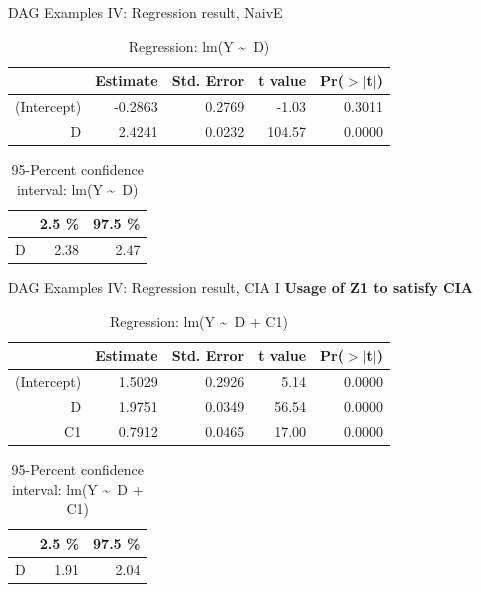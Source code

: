 \documentclass{beamer}\usepackage[]{graphicx}\usepackage[]{xcolor}
\begin{document}
\begin{frame}[fragile]{DAG Examples IV: Regression result, NaivE}
\begin{table}[ht]
\centering
\begingroup\small
\begin{tabular}{rrrrr}
  \hline
 & Estimate & Std. Error & t value & Pr($>$$|$t$|$) \\ 
  \hline
(Intercept) & -0.2863 & 0.2769 & -1.03 & 0.3011 \\ 
  D & 2.4241 & 0.0232 & 104.57 & 0.0000 \\ 
   \hline
\end{tabular}
\endgroup
\caption{Regression: lm(Y \textasciitilde ~D)} 
\end{table}
\begin{table}[ht]
\centering
\begingroup\small
\begin{tabular}{rrr}
  \hline
 & 2.5 \% & 97.5 \% \\ 
  \hline
D & 2.38 & 2.47 \\ 
   \hline
\end{tabular}
\endgroup
\caption{95-Percent confidence interval: lm(Y \textasciitilde ~D)} 
\end{table}

\end{frame}

\begin{frame}[fragile]{DAG Examples IV: Regression result, CIA I}
\textbf{Usage of Z1 to satisfy CIA}
\begin{table}[ht]
\centering
\begingroup\small
\begin{tabular}{rrrrr}
  \hline
 & Estimate & Std. Error & t value & Pr($>$$|$t$|$) \\ 
  \hline
(Intercept) & 1.5029 & 0.2926 & 5.14 & 0.0000 \\ 
  D & 1.9751 & 0.0349 & 56.54 & 0.0000 \\ 
  C1 & 0.7912 & 0.0465 & 17.00 & 0.0000 \\ 
   \hline
\end{tabular}
\endgroup
\caption{Regression: lm(Y \textasciitilde ~D + C1)} 
\end{table}
\begin{table}[ht]
\centering
\begingroup\small
\begin{tabular}{rrr}
  \hline
 & 2.5 \% & 97.5 \% \\ 
  \hline
D & 1.91 & 2.04 \\ 
   \hline
\end{tabular}
\endgroup
\caption{95-Percent confidence interval: lm(Y \textasciitilde ~D + C1)} 
\end{table}

\end{frame}
\end{document}
